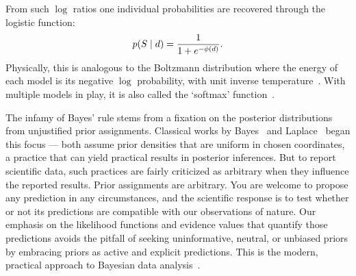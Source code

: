From such $\log$ ratios one individual probabilities are recovered through the
logistic function:
\begin{equation}
\label{eqn:searches_logistic}
p(S \mid d) = \frac{1}{1 + e^{-\phi(d)}}
.
\end{equation}
Physically, this is analogous to the Boltzmann distribution where the energy
of each model is its negative $\log$ probability, with unit inverse
temperature~\cite{
pmlr-v2-ranzato07a,
skilling2017david
}.
With multiple models in play, it is also called the `softmax'
function~\cite{MurphyKevinP.2012Mlap}.

The infamy of Bayes' rule stems from a fixation on the posterior distributions
from unjustified prior assignments.
Classical works by
Bayes~\cite{bayes1763lii} and
Laplace~\cite{laplace1774stigler} began this focus ---
both assume prior densities that are uniform in chosen coordinates, a practice
that can yield practical results in posterior inferences.
But to report scientific data, such practices are fairly criticized as
arbitrary when they influence the reported results.
Prior assignments are arbitrary.
You are welcome to propose any prediction in any circumstances, and the
scientific response is to test whether or not its predictions are compatible
with our observations of nature.
Our emphasis on the likelihood functions and evidence values that quantify
those predictions avoids the pitfall of seeking uninformative, neutral, or
unbiased priors by embracing priors as active and explicit predictions.
This is the modern, practical approach to Bayesian data analysis~\cite{
mackay2003information,
skilling2004nested,
skilling2006nested,
sivia2006data,
skilling2010foundations
}.

